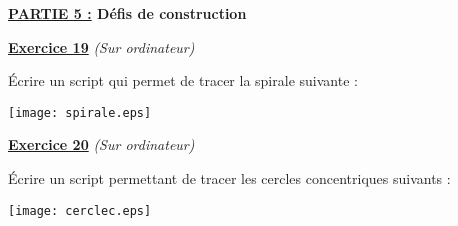 \documentclass[a4paper,11pt]{article}
\begin{document}
\begin{flushleft}
{\large \textbf{\underline{PARTIE 5 :} Défis de construction}}
\vspace*{0.2cm}
\end{flushleft}




\begin{center}
\textbf{{\large \underline{Exercice 19}}} \textit{(Sur ordinateur)}
\end{center}

Écrire un script qui permet de tracer la spirale suivante :\\

\begin{center}
\texttt{[image: spirale.eps]} 
\end{center}



\begin{center}
\textbf{{\large \underline{Exercice 20}}} \textit{(Sur ordinateur)}
\end{center}


Écrire un script permettant de tracer les cercles concentriques suivants :\\

\begin{center}
\texttt{[image: cerclec.eps]} 
\end{center}
\end{document}
